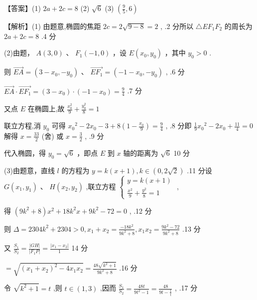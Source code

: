\documentclass[10pt]{article}
\begin{document}
【答案】(1) \({2a} + {2c} = 8\) (2) \(\sqrt{6}\) (3) \(\left( {\frac{9}{5},6}\right)\)

【解析】(1) 由题意,椭圆的焦距 \({2c} = 2\sqrt{9 - 8} = 2\) , .2 分所以 \(\bigtriangleup E{F}_{1}{F}_{2}\) 的周长为 \({2a} + {2c} = 8\) .4 分

(2)由题， \(A\left( {3,0}\right)\) 、 \({F}_{1}\left( {-1,0}\right)\) ，设 \(E\left( {{x}_{0},{y}_{0}}\right)\) ，其中 \({y}_{0} > 0\) .

则 \(\overrightarrow{EA} = \left( {3 - {x}_{0}, - {y}_{0}}\right) \text{ 、 }\overrightarrow{E{F}_{1}} = \left( {-1 - {x}_{0}, - {y}_{0}}\right)\) , .6 分

\(\overrightarrow{EA} \cdot  \overrightarrow{E{F}_{1}} = \left( {3 - {x}_{0}}\right)  \cdot  \left( {-1 - {x}_{0}}\right)  = \frac{9}{4}\) .7 分

又点 \(E\) 在椭圆上,故 \(\frac{{x}_{0}^{2}}{9} + \frac{{y}_{0}^{2}}{8} = 1\)

联立方程,消 \({y}_{0}\) 可得 \({x}_{0}{}^{2} - 2{x}_{0} - 3 + 8\left( {1 - \frac{{x}_{0}}{9}}\right)  = \frac{9}{4}\) , .8 分即 \(\frac{1}{9}{x}_{0}{}^{2} - 2{x}_{0} + \frac{11}{4} = 0\) 解得 \(x = \frac{33}{2}\) (舍) 或 \(x = \frac{3}{2}\) , .9 分

代入椭圆，得 \({y}_{0} = \sqrt{6}\) ，即点 \(E\) 到 \(x\) 轴的距离为 \(\sqrt{6}\) 10 分

(3)由题意，直线 \(l\) 的方程为 \(y = k\left( {x + 1}\right) ,k \in  \left( {0,2\sqrt{2}}\right)\) .11 分设 \(G\left( {{x}_{1},{y}_{1}}\right) \text{ 、 }H\left( {{x}_{2},{y}_{2}}\right)\) ,联立方程 \(\left\{  \begin{array}{l} y = k\left( {x + 1}\right) \\  \frac{{x}^{2}}{9} + \frac{{y}^{2}}{8} = 1 \end{array}\right.\) ,

得 \(\left( {9{k}^{2} + 8}\right) {x}^{2} + {18}{k}^{2}x + 9{k}^{2} - {72} = 0\) , .12 分

则 \(\Delta  = {2304}{k}^{2} + {2304} > 0,{x}_{1} + {x}_{2} = \frac{-{18}{k}^{2}}{9{k}^{2} + 8},{x}_{1}{x}_{2} = \frac{9{k}^{2} - {72}}{9{k}^{2} + 8}\) .13 分

又 \(\frac{{S}_{1}}{{S}_{2}} = \frac{\left| GH\right| }{\left| {F}_{1}P\right| } = \frac{\left| {x}_{1} - {x}_{2}\right| }{1}\) 14 分

\(= \sqrt{{\left( {x}_{1} + {x}_{2}\right) }^{2} - 4{x}_{1}{x}_{2}} = \frac{{48}\sqrt{{k}^{2} + 1}}{9{k}^{2} + 8}\) .16 分

令 \(\sqrt{{k}^{2} + 1} = t\) ,则 \(t \in  \left( {1,3}\right)\) ,因而 \(\frac{{S}_{1}}{{S}_{2}} = \frac{48t}{9{t}^{2} - 1} = \frac{48}{{9t} - \frac{1}{t}}\) , .17 分
\end{document}
